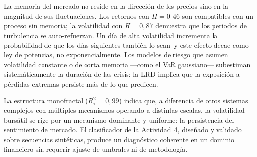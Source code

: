 La memoria del mercado no reside en la dirección de los precios sino en
la magnitud de sus fluctuaciones. Los retornos con $H = 0{,}46$ son
compatibles con un proceso sin memoria; la volatilidad con $H = 0{,}87$
demuestra que los periodos de turbulencia se auto-refuerzan. Un día de
alta volatilidad incrementa la probabilidad de que los días siguientes
también lo sean, y este efecto decae como ley de potencias, no
exponencialmente. Los modelos de riesgo que asumen volatilidad constante
o de corta memoria ---como el VaR gaussiano--- subestiman
sistemáticamente la duración de las crisis: la LRD implica que la
exposición a pérdidas extremas persiste más de lo que predicen.

La estructura monofractal ($R^2_{\tau} = 0{,}99$) indica que, a
diferencia de otros sistemas complejos con múltiples mecanismos operando
a distintas escalas, la volatilidad bursátil se rige por un mecanismo
dominante y uniforme: la persistencia del sentimiento de mercado. El
clasificador de la Actividad~4, diseñado y validado sobre secuencias
sintéticas, produce un diagnóstico coherente en un dominio financiero
sin requerir ajuste de umbrales ni de metodología.
